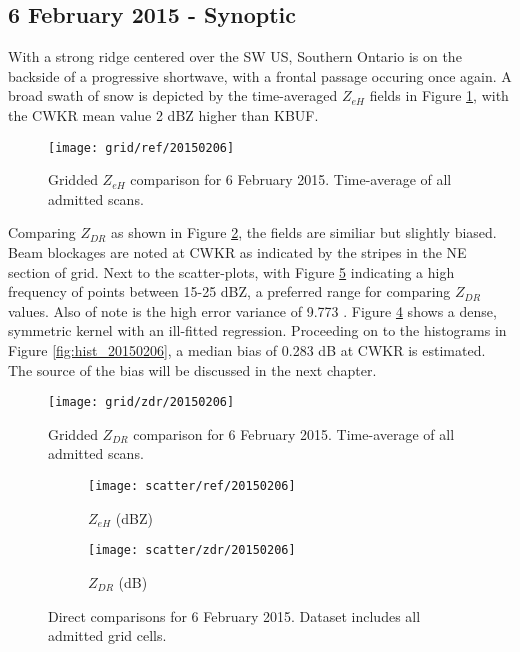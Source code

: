 \subsection{6 February 2015 - Synoptic}
With a strong ridge centered over the SW US, Southern Ontario is on the backside of a progressive shortwave, with a frontal passage occuring once again. A
broad swath of snow is depicted by the time-averaged $Z_{eH}$ fields in Figure \ref{fig:grid_ref_20150206}, with the CWKR mean value 2 dBZ higher than KBUF.
\begin{figure}[H]
\texttt{[image: grid/ref/20150206]}
\caption{Gridded $Z_{eH}$ comparison for 6 February 2015. Time-average of all admitted scans.} 
\label{fig:grid_ref_20150206}
\end{figure}
Comparing $Z_{DR}$ as shown in Figure \ref{fig:grid_zdr_20150206}, the fields are similiar but slightly biased. Beam blockages are noted at CWKR as indicated
by the stripes in the NE section of grid. Next to the scatter-plots, with Figure \ref{fig:scatter_20150206} indicating a high
frequency of points between 15-25 dBZ, a preferred range for comparing $Z_{DR}$ values. Also of note is the high error variance of 9.773 .
Figure \ref{fig:scatter_zdr_20150206} shows a dense, symmetric kernel with an ill-fitted regression. Proceeding on to the histograms in Figure
\ref{fig:hist_20150206}, a median bias of 0.283 dB at CWKR is estimated. The source of the bias will be discussed in the next chapter. 

\begin{figure}[p]
\texttt{[image: grid/zdr/20150206]}
\caption{Gridded $Z_{DR}$ comparison for 6 February 2015. Time-average of all admitted scans.} 
\label{fig:grid_zdr_20150206}
\end{figure}

\begin{figure}[p]
\centering
   \begin{subfigure}{0.49\linewidth} \centering
     \texttt{[image: scatter/ref/20150206]}
     \caption{$Z_{eH}$ (dBZ)}\label{fig:scatter_ref_20150206}
   \end{subfigure}
   \begin{subfigure}{0.49\linewidth} \centering
     \texttt{[image: scatter/zdr/20150206]}
     \caption{$Z_{DR}$ (dB)}\label{fig:scatter_zdr_20150206}
   \end{subfigure}
\caption{Direct comparisons for 6 February 2015. Dataset includes all admitted grid cells.} \label{fig:scatter_20150206}
\end{figure}

